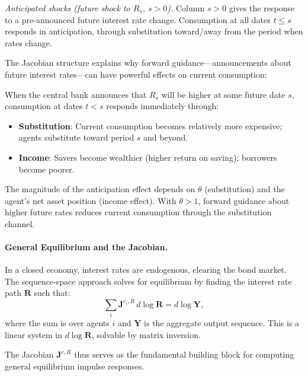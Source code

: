 \medskip
\noindent
\textit{Anticipated shocks (future shock to $R_s$, $s > 0$).} Column $s > 0$ gives the response to a pre-announced future interest rate change. Consumption at all dates $t \leq s$ responds in anticipation, through substitution toward/away from the period when rates change.

\begin{calloutimportant}
The Jacobian structure explains why forward guidance---announcements about future interest rates---can have powerful effects on current consumption:

\medskip
When the central bank announces that $R_s$ will be higher at some future date $s$, consumption at dates $t < s$ responds immediately through:
\begin{itemize}[nosep]
\item \textbf{Substitution}: Current consumption becomes relatively more expensive; agents substitute toward period $s$ and beyond.
\item \textbf{Income}: Savers become wealthier (higher return on saving); borrowers become poorer.
\end{itemize}

The magnitude of the anticipation effect depends on $\theta$ (substitution) and the agent's net asset position (income effect). With $\theta > 1$, forward guidance about higher future rates reduces current consumption through the substitution channel.
\end{calloutimportant}

\paragraph{General Equilibrium and the Jacobian.}
In a closed economy, interest rates are endogenous, clearing the bond market. The sequence-space approach solves for equilibrium by finding the interest rate path $\mathbf{R}$ such that:
\begin{equation}
\sum_{i} \mathbf{J}^{c_i, R} \, d \log \mathbf{R} = d \log \mathbf{Y},
\label{eq:ge-clearing}
\end{equation}
where the sum is over agents $i$ and $\mathbf{Y}$ is the aggregate output sequence. This is a linear system in $d \log \mathbf{R}$, solvable by matrix inversion.

The Jacobian $\mathbf{J}^{c,R}$ thus serves as the fundamental building block for computing general equilibrium impulse responses.


